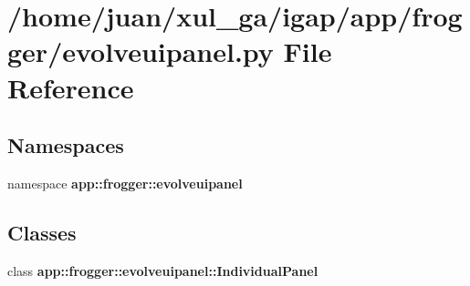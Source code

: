 \section{/home/juan/xul\_\-ga/igap/app/frogger/evolveuipanel.py File Reference}
\label{frogger_2evolveuipanel_8py}
\subsection*{Namespaces}
\begin{CompactItemize}
\item 
namespace {\bf app::frogger::evolveuipanel}
\end{CompactItemize}
\subsection*{Classes}
\begin{CompactItemize}
\item 
class {\bf app::frogger::evolveuipanel::IndividualPanel}
\end{CompactItemize}
